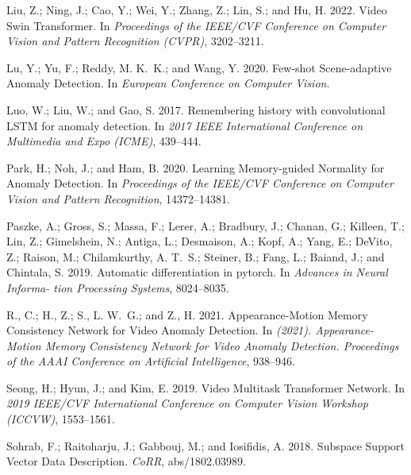 \documentclass[letterpaper]{article} \usepackage{aaai23}  \usepackage{times}  \usepackage{helvet}  \usepackage{courier}  \usepackage[hyphens]{url}  \usepackage{graphicx} \urlstyle{rm} \def\UrlFont{\rm}  \usepackage{natbib}  \usepackage{caption} \frenchspacing  \setlength{\pdfpagewidth}{8.5in}  \setlength{\pdfpageheight}{11in}  \usepackage{algorithm}
\begin{document}
\begin{thebibliography}{50}
Liu, Z.; Ning, J.; Cao, Y.; Wei, Y.; Zhang, Z.; Lin, S.; and Hu, H. 2022.
\newblock Video Swin Transformer.
\newblock In \emph{Proceedings of the IEEE/CVF Conference on Computer Vision
  and Pattern Recognition (CVPR)}, 3202--3211.

Lu, Y.; Yu, F.; Reddy, M. K.~K.; and Wang, Y. 2020.
\newblock Few-shot Scene-adaptive Anomaly Detection.
\newblock In \emph{European Conference on Computer Vision}.

Luo, W.; Liu, W.; and Gao, S. 2017.
\newblock Remembering history with convolutional LSTM for anomaly detection.
\newblock In \emph{2017 IEEE International Conference on Multimedia and Expo
  (ICME)}, 439--444.

Park, H.; Noh, J.; and Ham, B. 2020.
\newblock Learning Memory-guided Normality for Anomaly Detection.
\newblock In \emph{Proceedings of the IEEE/CVF Conference on Computer Vision
  and Pattern Recognition}, 14372--14381.

Paszke, A.; Gross, S.; Massa, F.; Lerer, A.; Bradbury, J.; Chanan, G.; Killeen,
  T.; Lin, Z.; Gimelshein, N.; Antiga, L.; Desmaison, A.; Kopf, A.; Yang, E.;
  DeVito, Z.; Raison, M.; Chilamkurthy, A. T.~S.; Steiner, B.; Fang, L.;
  Baiand, J.; and Chintala, S. 2019.
\newblock Automatic differentiation in pytorch.
\newblock In \emph{Advances in Neural Informa- tion Processing Systems},
  8024--8035.

R., C.; H., Z.; S., L. W.~G.; and Z., H. 2021.
\newblock Appearance-Motion Memory Consistency Network for Video Anomaly
  Detection.
\newblock In \emph{(2021). Appearance-Motion Memory Consistency Network for
  Video Anomaly Detection. Proceedings of the AAAI Conference on Artificial
  Intelligence}, 938--946.

Seong, H.; Hyun, J.; and Kim, E. 2019.
\newblock Video Multitask Transformer Network.
\newblock In \emph{2019 IEEE/CVF International Conference on Computer Vision
  Workshop (ICCVW)}, 1553--1561.

Sohrab, F.; Raitoharju, J.; Gabbouj, M.; and Iosifidis, A. 2018.
\newblock Subspace Support Vector Data Description.
\newblock \emph{CoRR}, abs/1802.03989.


\end{thebibliography}
\end{document}
